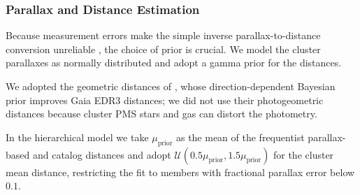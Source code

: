\documentclass{aa}
\begin{document}
	\subsubsection{Parallax and Distance Estimation}
Because measurement errors make the simple inverse parallax-to-distance conversion unreliable \citep{2015PASP..127..994B,2021AJ....161..147B}, the choice of prior is crucial. We model the cluster parallaxes as normally distributed and adopt a gamma prior for the distances.

We adopted the geometric distances of \citet{2021AJ....161..147B}, whose direction-dependent Bayesian prior improves Gaia EDR3 distances; we did not use their photogeometric distances because cluster PMS stars and gas can distort the photometry.

In the hierarchical model we take $\mu_{\mathrm{prior}}$ as the mean of the frequentist parallax-based and catalog distances and adopt $\mathcal{U}(0.5\mu_{\mathrm{prior}},1.5\mu_{\mathrm{prior}})$ for the cluster mean distance, restricting the fit to members with fractional parallax error below $0.1$.
\end{document}
